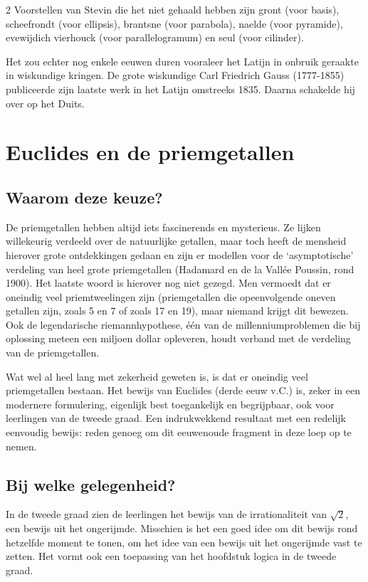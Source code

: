 \begin{multicols}{2}
    Voorstellen van Stevin die het niet gehaald hebben zijn gront (voor basis), scheefrondt (voor ellipsis), brantsne (voor parabola), naelde (voor pyramide), evewijdich vierhouck (voor parallelogramum) en seul (voor cilinder).

    Het zou echter nog enkele eeuwen duren vooraleer het Latijn in onbruik geraakte in wiskundige kringen. De grote wiskundige Carl Friedrich Gauss (1777-1855) publiceerde zijn laatste werk in het Latijn omstreeks 1835. Daarna schakelde hij over op het Duits.

	\section{Euclides en de priemgetallen} \label{euclides}
    \subsection*{Waarom deze keuze?}
 De priemgetallen hebben altijd iets fascinerends en mysterieus. Ze lijken willekeurig verdeeld over de natuurlijke getallen, maar toch heeft de mensheid hierover grote ontdekkingen gedaan en zijn er modellen voor de `asymptotische' verdeling van heel grote priemgetallen (Hadamard en de la Vallée Poussin, rond 1900). Het laatste woord is hierover nog niet gezegd. Men vermoedt dat er oneindig veel priemtweelingen zijn (priemgetallen die opeenvolgende oneven getallen zijn, zoals 5 en 7 of zoals 17 en 19), maar niemand krijgt dit bewezen. Ook de legendarische riemannhypothese, één van de millenniumproblemen die bij oplossing meteen een miljoen dollar opleveren, houdt verband met de verdeling van de priemgetallen.
 
Wat wel al heel lang met zekerheid geweten is, is dat er oneindig veel priemgetallen bestaan. Het bewijs van Euclides (derde eeuw v.C.) is, zeker in een modernere formulering, eigenlijk best toegankelijk en begrijpbaar, ook voor leerlingen van de tweede graad. Een indrukwekkend resultaat met een redelijk eenvoudig bewijs: reden genoeg om dit eeuwenoude fragment in deze loep op te nemen.

 \subsection*{Bij welke gelegenheid?}
In de tweede graad zien de leerlingen het bewijs van de irrationaliteit van $\sqrt{2}$, een bewijs uit het ongerijmde. Misschien is het een goed idee om dit bewijs rond hetzelfde moment te tonen, om het idee van een bewijs uit het ongerijmde vast te zetten. Het vormt ook een toepassing van het hoofdstuk logica in de tweede graad. 


\end{multicols}
